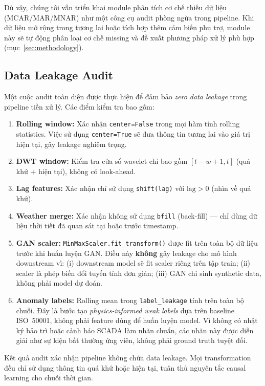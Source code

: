 \documentclass[conference]{IEEEtran}
\begin{document}
Dù vậy, chúng tôi vẫn triển khai module phân tích cơ chế thiếu dữ liệu (MCAR/MAR/MNAR)
như một công cụ audit phòng ngừa trong pipeline.
Khi dữ liệu mở rộng trong tương lai hoặc tích hợp thêm cảm biến phụ trợ,
module này sẽ tự động phân loại cơ chế missing và đề xuất phương pháp xử lý phù hợp
(mục~\ref{sec:methodology}).

\subsection{Data Leakage Audit}

Một cuộc audit toàn diện được thực hiện để đảm bảo \textit{zero data leakage} trong pipeline tiền xử lý.
Các điểm kiểm tra bao gồm:

\begin{enumerate}
    \item \textbf{Rolling window:} Xác nhận \texttt{center=False} trong mọi hàm tính rolling statistics. Việc sử dụng \texttt{center=True} sẽ đưa thông tin tương lai vào giá trị hiện tại, gây leakage nghiêm trọng.
    \item \textbf{DWT window:} Kiểm tra cửa sổ wavelet chỉ bao gồm $[t-w+1, t]$ (quá khứ + hiện tại), không có look-ahead.
    \item \textbf{Lag features:} Xác nhận chỉ sử dụng \texttt{shift(lag)} với $\text{lag} > 0$ (nhìn về quá khứ).
    \item \textbf{Weather merge:} Xác nhận không sử dụng \texttt{bfill} (back-fill) --- chỉ dùng dữ liệu thời tiết đã quan sát tại hoặc trước timestamp.
    \item \textbf{GAN scaler:} \texttt{MinMaxScaler.fit\_transform()} được fit trên toàn bộ dữ liệu trước khi huấn luyện GAN. Điều này \textbf{không} gây leakage cho mô hình downstream vì: (i) downstream model sẽ fit scaler riêng trên tập train; (ii) scaler là phép biến đổi tuyến tính đơn giản; (iii) GAN chỉ sinh synthetic data, không phải model dự đoán.
    \item \textbf{Anomaly labels:} Rolling mean trong \texttt{label\_leakage} tính trên toàn bộ chuỗi. Đây là bước tạo \textit{physics-informed weak labels} dựa trên baseline ISO~50001, không phải feature dùng để huấn luyện model. Vì không có nhật ký bảo trì hoặc cảnh báo SCADA làm nhãn chuẩn, các nhãn này được diễn giải như sự kiện bất thường ứng viên, không phải ground truth tuyệt đối.
\end{enumerate}

Kết quả audit xác nhận pipeline không chứa data leakage.
Mọi transformation đều chỉ sử dụng thông tin quá khứ hoặc hiện tại,
tuân thủ nguyên tắc causal learning cho chuỗi thời gian.
\end{document}
